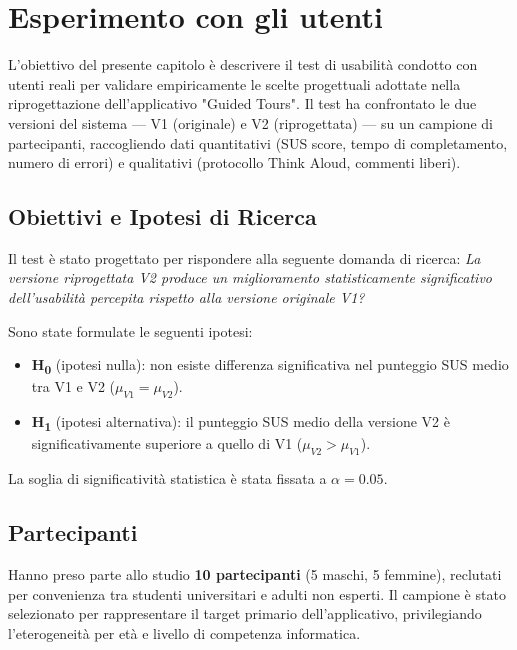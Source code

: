 \chapter{Esperimento con gli utenti}
\label{ch:esperimento}

L'obiettivo del presente capitolo è descrivere il test di usabilità condotto con utenti reali per validare empiricamente le scelte progettuali adottate nella riprogettazione dell'applicativo "Guided Tours". Il test ha confrontato le due versioni del sistema --- V1 (originale) e V2 (riprogettata) --- su un campione di partecipanti, raccogliendo dati quantitativi (SUS score, tempo di completamento, numero di errori) e qualitativi (protocollo Think Aloud, commenti liberi).

\section{Obiettivi e Ipotesi di Ricerca}

Il test è stato progettato per rispondere alla seguente domanda di ricerca: \textit{La versione riprogettata V2 produce un miglioramento statisticamente significativo dell'usabilità percepita rispetto alla versione originale V1?}

Sono state formulate le seguenti ipotesi:
\begin{itemize}
    \item \textbf{H\textsubscript{0}} (ipotesi nulla): non esiste differenza significativa nel punteggio SUS medio tra V1 e V2 ($\mu_{V1} = \mu_{V2}$).
    \item \textbf{H\textsubscript{1}} (ipotesi alternativa): il punteggio SUS medio della versione V2 è significativamente superiore a quello di V1 ($\mu_{V2} > \mu_{V1}$).
\end{itemize}

La soglia di significatività statistica è stata fissata a $\alpha = 0.05$.

\section{Partecipanti}

Hanno preso parte allo studio \textbf{10 partecipanti} (5 maschi, 5 femmine), reclutati per convenienza tra studenti universitari e adulti non esperti. Il campione è stato selezionato per rappresentare il target primario dell'applicativo, privilegiando l'eterogeneità per età e livello di competenza informatica.

